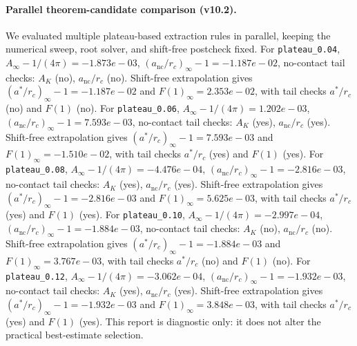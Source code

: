 \paragraph{Parallel theorem-candidate comparison (v10.2).}
We evaluated multiple plateau-based extraction rules in parallel, keeping the numerical sweep, root solver, and shift-free postcheck fixed. For \texttt{plateau_0.04}, $A_\infty-1/(4\pi)=-1.873e-03$, $(a_{\mathrm{nc}}/r_c)_\infty-1=-1.187e-02$, no-contact tail checks: $A_K$ (no), $a_{\mathrm{nc}}/r_c$ (no). Shift-free extrapolation gives $(a^*/r_c)_\infty-1=-1.187e-02$ and $F(1)_\infty=2.353e-02$, with tail checks $a^*/r_c$ (no) and $F(1)$ (no). For \texttt{plateau_0.06}, $A_\infty-1/(4\pi)=1.202e-03$, $(a_{\mathrm{nc}}/r_c)_\infty-1=7.593e-03$, no-contact tail checks: $A_K$ (yes), $a_{\mathrm{nc}}/r_c$ (yes). Shift-free extrapolation gives $(a^*/r_c)_\infty-1=7.593e-03$ and $F(1)_\infty=-1.510e-02$, with tail checks $a^*/r_c$ (yes) and $F(1)$ (yes). For \texttt{plateau_0.08}, $A_\infty-1/(4\pi)=-4.476e-04$, $(a_{\mathrm{nc}}/r_c)_\infty-1=-2.816e-03$, no-contact tail checks: $A_K$ (yes), $a_{\mathrm{nc}}/r_c$ (yes). Shift-free extrapolation gives $(a^*/r_c)_\infty-1=-2.816e-03$ and $F(1)_\infty=5.625e-03$, with tail checks $a^*/r_c$ (yes) and $F(1)$ (yes). For \texttt{plateau_0.10}, $A_\infty-1/(4\pi)=-2.997e-04$, $(a_{\mathrm{nc}}/r_c)_\infty-1=-1.884e-03$, no-contact tail checks: $A_K$ (no), $a_{\mathrm{nc}}/r_c$ (no). Shift-free extrapolation gives $(a^*/r_c)_\infty-1=-1.884e-03$ and $F(1)_\infty=3.767e-03$, with tail checks $a^*/r_c$ (no) and $F(1)$ (no). For \texttt{plateau_0.12}, $A_\infty-1/(4\pi)=-3.062e-04$, $(a_{\mathrm{nc}}/r_c)_\infty-1=-1.932e-03$, no-contact tail checks: $A_K$ (yes), $a_{\mathrm{nc}}/r_c$ (yes). Shift-free extrapolation gives $(a^*/r_c)_\infty-1=-1.932e-03$ and $F(1)_\infty=3.848e-03$, with tail checks $a^*/r_c$ (yes) and $F(1)$ (yes). This report is diagnostic only: it does not alter the practical best-estimate selection.
